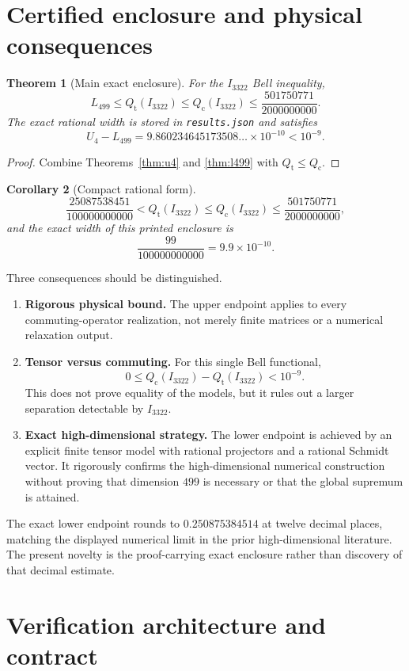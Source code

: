 \documentclass[11pt]{article}
\newtheorem{theorem}{Theorem}[section]
\newtheorem{corollary}[theorem]{Corollary}
\newcommand{\1}{\mathbb{1}}
\newcommand{\Qt}{Q_{\mathrm t}}
\newcommand{\Qc}{Q_{\mathrm c}}
\begin{document}
\section{Certified enclosure and physical consequences}\label{sec:main}
\begin{theorem}[Main exact enclosure]\label{thm:main}
For the $I_{3322}$ Bell inequality,
\[
\boxed{
L_{499}\le\Qt(I_{3322})\le\Qc(I_{3322})\le
\frac{501750771}{2000000000}.}
\]
The exact rational width is stored in \texttt{results.json} and satisfies
\[
U_4-L_{499}=9.860234645173508\ldots\times10^{-10}<10^{-9}.
\]
\end{theorem}
\begin{proof}
Combine Theorems~\ref{thm:u4} and \ref{thm:l499} with $\Qt\le\Qc$.
\end{proof}

\begin{corollary}[Compact rational form]\label{cor:compact}
\[
\frac{25087538451}{100000000000}<\Qt(I_{3322})\le\Qc(I_{3322})\le
\frac{501750771}{2000000000},
\]
and the exact width of this printed enclosure is
\[
\frac{99}{100000000000}=9.9\times10^{-10}.
\]
\end{corollary}

Three consequences should be distinguished.
\begin{enumerate}[label=(\alph*)]
\item \textbf{Rigorous physical bound.}  The upper endpoint applies to every commuting-operator realization, not merely finite matrices or a numerical relaxation output.
\item \textbf{Tensor versus commuting.}  For this single Bell functional,
\[
0\le\Qc(I_{3322})-\Qt(I_{3322})<10^{-9}.
\]
This does not prove equality of the models, but it rules out a larger separation detectable by $I_{3322}$.
\item \textbf{Exact high-dimensional strategy.}  The lower endpoint is achieved by an explicit finite tensor model with rational projectors and a rational Schmidt vector.  It rigorously confirms the high-dimensional numerical construction without proving that dimension $499$ is necessary or that the global supremum is attained.
\end{enumerate}
The exact lower endpoint rounds to $0.250875384514$ at twelve decimal places, matching the displayed numerical limit in the prior high-dimensional literature.  The present novelty is the proof-carrying exact enclosure rather than discovery of that decimal estimate.

\section{Verification architecture and contract}\label{sec:verification}
\end{document}
